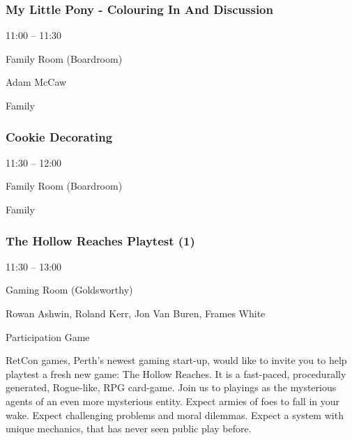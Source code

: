 \documentclass{scrreprt}
\begin{document}
\begin{multicols}{2}
\subsubsection*{My Little Pony - Colouring In And Discussion}\begin{description}
\setlength{\itemsep}{0pt}
\setlength{\parsep}{0pt}
\setlength{\parskip}{0pt}
\item[Time:]{11:00 -- 11:30}
\item[Venue:]{Family Room (Boardroom)}
\item[People:]{Adam McCaw}
\item[Tags:]{Family}\end{description}

\subsubsection*{Cookie Decorating}\begin{description}
\setlength{\itemsep}{0pt}
\setlength{\parsep}{0pt}
\setlength{\parskip}{0pt}
\item[Time:]{11:30 -- 12:00}
\item[Venue:]{Family Room (Boardroom)}
\item[Tags:]{Family}\end{description}

\subsubsection*{The Hollow Reaches Playtest (1)}\begin{description}
\setlength{\itemsep}{0pt}
\setlength{\parsep}{0pt}
\setlength{\parskip}{0pt}
\item[Time:]{11:30 -- 13:00}
\item[Venue:]{Gaming Room (Goldsworthy)}
\item[People:]{Rowan Ashwin, Roland Kerr, Jon Van Buren, Frames White}
\item[Tags:]{Participation Game}\end{description}
RetCon games, Perth's newest gaming start-up, would like to invite you to help playtest a fresh new game: The Hollow Reaches. It is a fast-paced, procedurally generated, Rogue-like, RPG card-game. Join us to playings as the mysterious agents of an even more mysterious entity. Expect armies of foes to fall in your wake. Expect challenging problems and moral dilemmas. Expect a system with unique mechanics, that has never seen public play before.

\end{multicols}
\end{document}
